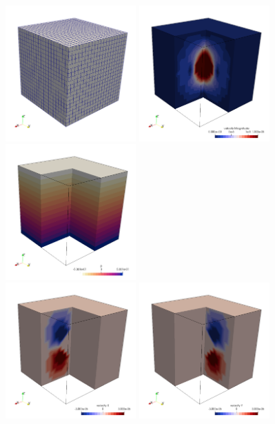 \begin{center}
\includegraphics[width=5cm]{python_codes/fieldstone_82/results/bench3/grid.png}
\includegraphics[width=5cm]{python_codes/fieldstone_82/results/bench3/vel.png}
\includegraphics[width=5cm]{python_codes/fieldstone_82/results/bench3/press.png}\\
\includegraphics[width=5cm]{python_codes/fieldstone_82/results/bench3/u.png}
\includegraphics[width=5cm]{python_codes/fieldstone_82/results/bench3/v.png}

\end{center}
